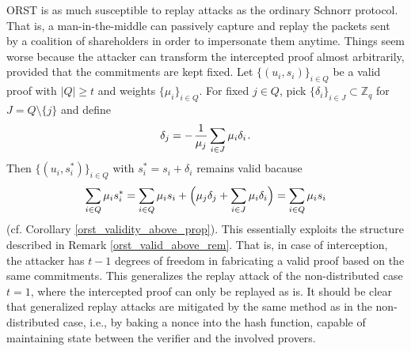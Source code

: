 \documentclass{iacrtrans}
\begin{document}
\textsf{ORST}
is as much susceptible to replay attacks
as the ordinary Schnorr protocol.
That is, a man-in-the-middle
can passively capture and replay
the packets sent by a coalition
of shareholders in order to impersonate them anytime.
Things seem worse
because the attacker can transform the
intercepted proof
almost arbitrarily,
provided that the commitments are kept fixed.
Let
$\{(u_i, s_i)\}_{i \in Q}$ be a
valid proof with $|Q| \ge t$ and weights $\{\mu_i\}_{i \in Q}$.
For fixed $j \in Q$,
pick $\{\delta_i\}_{i \in J} \subset \mathbb{Z}_q$
for $J = Q \setminus \{j\}$ and define
\vspace{5pt}
\begin{equation*}
\delta_j = -\hspace{1pt} \frac{1}{\mu_j}\sum_{i \in J} \mu_i \delta_i\hspace{1pt}.
\vspace{5pt}
\end{equation*}
Then $\{(u_i, s_i^*)\}_{i \in Q}$ with
$s_i^* = s_i + \delta_i$ remains valid bacause
\vspace{5pt}
\begin{equation*}
\sum_{i \in Q} \mu_i s_i^* =
\sum_{i \in Q} \mu_i s_i + \Big(\mu_j \delta_j + \sum_{i \in J} \mu_i \delta_i\Big) = 
\sum_{i \in Q} \mu_i s_i
\vspace{5pt}
\end{equation*}
\noindent
(cf. Corollary \ref{orst_validity_above_prop}).
This essentially exploits the structure described in
Remark \ref{orst_valid_above_rem}.
That is, in case of interception,
the attacker has $t-1$ degrees of freedom
in fabricating a valid proof based on the same commitments.
This generalizes the replay attack of the non-distributed
case $t=1$, where the intercepted proof can only be replayed as is.
It should be clear that
generalized replay attacks are
mitigated by the same method as in the non-distributed case,
i.e., by baking a nonce into the hash function,
capable of maintaining state between
the verifier and the involved provers.
\end{document}
